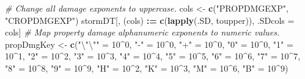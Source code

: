 \documentclass[]{article}
\newenvironment{Shaded}{\begin{snugshade}}{\end{snugshade}}
\newcommand{\KeywordTok}[1]{\textcolor[rgb]{0.13,0.29,0.53}{\textbf{#1}}}
\newcommand{\DecValTok}[1]{\textcolor[rgb]{0.00,0.00,0.81}{#1}}
\newcommand{\CharTok}[1]{\textcolor[rgb]{0.31,0.60,0.02}{#1}}
\newcommand{\StringTok}[1]{\textcolor[rgb]{0.31,0.60,0.02}{#1}}
\newcommand{\CommentTok}[1]{\textcolor[rgb]{0.56,0.35,0.01}{\textit{#1}}}
\newcommand{\OperatorTok}[1]{\textcolor[rgb]{0.81,0.36,0.00}{\textbf{#1}}}
\newcommand{\ErrorTok}[1]{\textcolor[rgb]{0.64,0.00,0.00}{\textbf{#1}}}
\newcommand{\NormalTok}[1]{#1}
\begin{document}
\begin{Shaded}
\begin{Highlighting}[]
\CommentTok{# Change all damage exponents to uppercase.}
\NormalTok{cols <-}\StringTok{ }\KeywordTok{c}\NormalTok{(}\StringTok{"PROPDMGEXP"}\NormalTok{, }\StringTok{"CROPDMGEXP"}\NormalTok{)}
\NormalTok{stormDT[,  (cols) }\OperatorTok{:}\ErrorTok{=}\StringTok{ }\KeywordTok{c}\NormalTok{(}\KeywordTok{lapply}\NormalTok{(.SD, toupper)), .SDcols =}\StringTok{ }\NormalTok{cols]}
\CommentTok{# Map property damage alphanumeric exponents to numeric values.}
\NormalTok{propDmgKey <-}\StringTok{  }\KeywordTok{c}\NormalTok{(}\StringTok{"}\CharTok{\textbackslash{}"\textbackslash{}"}\StringTok{"}\NormalTok{ =}\StringTok{ }\DecValTok{10}\OperatorTok{^}\DecValTok{0}\NormalTok{,}
                 \StringTok{"-"}\NormalTok{ =}\StringTok{ }\DecValTok{10}\OperatorTok{^}\DecValTok{0}\NormalTok{, }
                 \StringTok{"+"}\NormalTok{ =}\StringTok{ }\DecValTok{10}\OperatorTok{^}\DecValTok{0}\NormalTok{,}
                 \StringTok{"0"}\NormalTok{ =}\StringTok{ }\DecValTok{10}\OperatorTok{^}\DecValTok{0}\NormalTok{,}
                 \StringTok{"1"}\NormalTok{ =}\StringTok{ }\DecValTok{10}\OperatorTok{^}\DecValTok{1}\NormalTok{,}
                 \StringTok{"2"}\NormalTok{ =}\StringTok{ }\DecValTok{10}\OperatorTok{^}\DecValTok{2}\NormalTok{,}
                 \StringTok{"3"}\NormalTok{ =}\StringTok{ }\DecValTok{10}\OperatorTok{^}\DecValTok{3}\NormalTok{,}
                 \StringTok{"4"}\NormalTok{ =}\StringTok{ }\DecValTok{10}\OperatorTok{^}\DecValTok{4}\NormalTok{,}
                 \StringTok{"5"}\NormalTok{ =}\StringTok{ }\DecValTok{10}\OperatorTok{^}\DecValTok{5}\NormalTok{,}
                 \StringTok{"6"}\NormalTok{ =}\StringTok{ }\DecValTok{10}\OperatorTok{^}\DecValTok{6}\NormalTok{,}
                 \StringTok{"7"}\NormalTok{ =}\StringTok{ }\DecValTok{10}\OperatorTok{^}\DecValTok{7}\NormalTok{,}
                 \StringTok{"8"}\NormalTok{ =}\StringTok{ }\DecValTok{10}\OperatorTok{^}\DecValTok{8}\NormalTok{,}
                 \StringTok{"9"}\NormalTok{ =}\StringTok{ }\DecValTok{10}\OperatorTok{^}\DecValTok{9}\NormalTok{,}
                 \StringTok{"H"}\NormalTok{ =}\StringTok{ }\DecValTok{10}\OperatorTok{^}\DecValTok{2}\NormalTok{,}
                 \StringTok{"K"}\NormalTok{ =}\StringTok{ }\DecValTok{10}\OperatorTok{^}\DecValTok{3}\NormalTok{,}
                 \StringTok{"M"}\NormalTok{ =}\StringTok{ }\DecValTok{10}\OperatorTok{^}\DecValTok{6}\NormalTok{,}
                 \StringTok{"B"}\NormalTok{ =}\StringTok{ }\DecValTok{10}\OperatorTok{^}\DecValTok{9}\NormalTok{)}

\end{Highlighting}
\end{Shaded}
\end{document}
